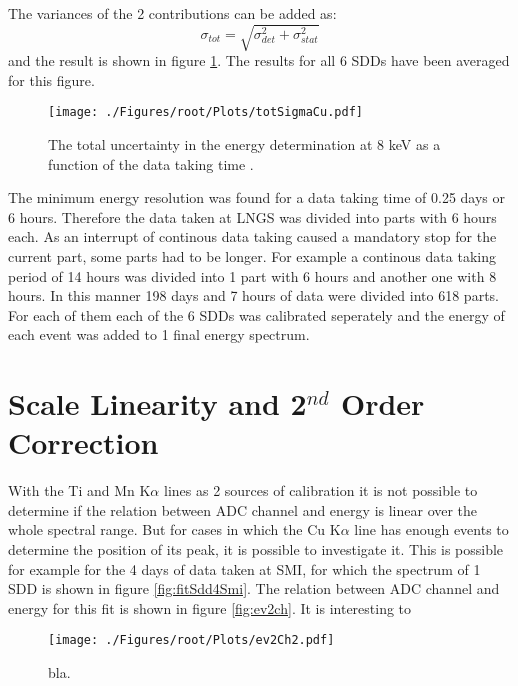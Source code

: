 The variances of the 2 contributions can be added as:
\begin{equation}
 \sigma_{tot} = \sqrt{\sigma_{det}^{2}+\sigma_{stat}^{2}}
\end{equation} 
and the result is shown in figure \ref{fig:totSigCu}. The results for all 6 SDDs have been averaged for this figure.
\begin{figure}[h]
 \centering
 \texttt{[image: ./Figures/root/Plots/totSigmaCu.pdf]}
 \caption{The total uncertainty in the energy determination at 8 keV as a function of the data taking time .}
 \label{fig:totSigCu}
\end{figure}
The minimum energy resolution was found for a data taking time of 0.25 days or 6 hours. Therefore the data taken at LNGS was divided into parts with 6 hours each. As an interrupt of continous data taking caused a mandatory stop for the current part, some parts had to be longer. For example a continous data taking period of 14 hours was divided into 1 part with 6 hours and another one with 8 hours. In this manner 198 days and 7 hours of data were divided into 618 parts. For each of them each of the 6 SDDs was calibrated seperately and the energy of each event was added to 1 final energy spectrum.

\section{Scale Linearity and 2$^{nd}$ Order Correction}

With the Ti and Mn K$\alpha$ lines as 2 sources of calibration it is not possible to determine if the relation between ADC channel and energy is linear over the whole spectral range. But for cases in which the Cu K$\alpha$ line has enough events to determine the position of its peak, it is possible to investigate it. This is possible for example for the 4 days of data taken at SMI, for which the spectrum of 1 SDD is shown in figure \ref{fig:fitSdd4Smi}. The relation between ADC channel and energy for this fit is shown in figure \ref{fig:ev2ch}. It is interesting to 
\begin{figure}[h]
 \centering
 \texttt{[image: ./Figures/root/Plots/ev2Ch2.pdf]}
 \caption{bla.}
 \label{fig:scaleLin}
\end{figure}





